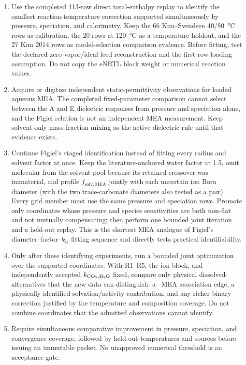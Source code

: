 \documentclass[10pt,oneside]{scrartcl}
\begin{document}
\begin{enumerate}
rows as an external challenge unless the salt is represented explicitly.
\item Use the completed 113-row direct total-enthalpy replay to identify the
smallest reaction-temperature correction supported simultaneously by pressure,
speciation, and calorimetry. Keep the 66 Kim--Svendsen 40/80~\si{\celsius}
rows as calibration, the 20 rows at \SI{120}{\celsius} as a temperature
holdout, and the 27 Kim 2014 rows as model-selection comparison evidence.
Before fitting, test the declared zero-vapor/ideal-feed reconstruction and the
first-row loading assumption. Do not copy the eNRTL block weight or numerical
reaction values.
\item Acquire or digitize independent static-permittivity observations for
loaded aqueous MEA. The completed fixed-parameter comparison cannot select
between the A and E dielectric responses from pressure and speciation alone,
and the Figiel relation is not an independent MEA measurement. Keep
solvent-only mass-fraction mixing as the active dielectric rule until that
evidence exists.
\item Continue Figiel's staged identification instead of fitting every radius
and solvent factor at once. Keep the
literature-anchored water factor at 1.5, omit molecular  from the
solvent pool because its retained crossover was immaterial, and profile
$f_{\mathrm{solv},\mathrm{MEA}}$ jointly with each uncertain ion Born diameter
(with the two trace-carbonate diameters also tested as a pair). Every grid
member must use the same pressure and speciation rows. Promote only coordinates
whose pressure and species sensitivities are both non-flat and not mutually
compensating; then perform one bounded joint iteration and a held-out replay.
This is the shortest MEA analogue of Figiel's diameter--factor--$k_{ij}$ fitting
sequence and directly tests practical identifiability.
\item Only after these identifying experiments, run a bounded joint
optimization over the supported coordinates. With R1--R5, the ion block, and independently accepted
$k_{\ce{CO2},\ce{H2O}}$ fixed, compare only physical dissolved-
alternatives that the new data can distinguish: a --MEA association
edge, a physically identified solvation/activity contribution, and any richer
binary correction justified by the temperature and composition coverage. Do
not combine coordinates that the admitted observations cannot identify.
\item Require simultaneous comparative improvement in pressure, speciation,
and convergence coverage, followed by held-out temperatures and sources before
issuing an immutable packet. No unapproved numerical threshold is an
acceptance gate.
\end{enumerate}
\end{document}
